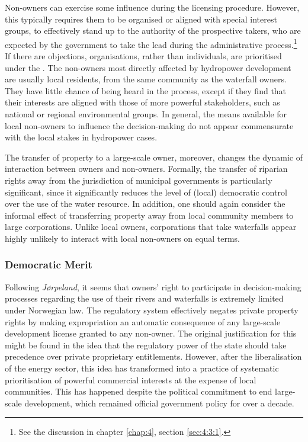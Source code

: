 Non-owners can exercise some influence during the licensing procedure. However, this typically requires them to be organised or aligned with special interest groups, to effectively stand up to the authority of the prospective takers, who are expected by the government to take the lead during the administrative process.\footnote{See the discussion in chapter \ref{chap:4}, section \ref{sec:4:3:1}.} If there are objections, organisations, rather than individuals, are prioritised under the \cite{wra17}. The non-owners most directly affected by hydropower development are usually local residents, from the same community as the waterfall owners. They have little chance of being heard in the process, except if they find that their interests are aligned with those of more powerful stakeholders, such as national or regional environmental groups. In general, the means available for local non-owners to influence the decision-making do not appear commensurate with the local stakes in hydropower cases.

The transfer of property to a large-scale owner, moreover, changes the dynamic of interaction between owners and non-owners. Formally, the transfer of riparian rights away from the jurisdiction of municipal governments is particularly significant, since it significantly reduces the level of (local) democratic control over the use of the water resource. In addition, one should again consider the informal effect of transferring property away from local community members to large corporations. Unlike local owners, corporations that take waterfalls appear highly unlikely to interact with local non-owners on equal terms.

\subsubsection{Democratic Merit}\label{sec:5:7:9}

Following \emph{Jørpeland}, it seems that owners' right to participate in decision-making processes regarding the use of their rivers and waterfalls is extremely limited under Norwegian law. The regulatory system effectively negates private property rights by making expropriation an automatic consequence of any large-scale development license granted to any non-owner. The original justification for this might be found in the idea that the regulatory power of the state should take precedence over private proprietary entitlements. However, after the liberalisation of the energy sector, this idea has transformed into a practice of systematic prioritisation of powerful commercial interests at the expense of local communities. This has happened despite the political commitment to end large-scale development, which remained official government policy for over a decade.

